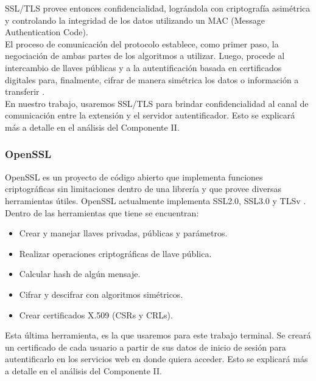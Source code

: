 \documentclass[12pt, a4paper, titlepage]{report}
\begin{document}
                SSL/TLS provee entonces confidencialidad, lográndola con criptografía asimétrica y controlando la integridad de los datos utilizando un MAC (Message Authentication Code).\\
                
                El proceso de comunicación del protocolo establece, como primer paso, la negociación de ambas partes de los algoritmos a utilizar. Luego, procede al intercambio de llaves públicas y a la autentificación basada en certificados digitales para, finalmente, cifrar de manera simétrica los datos o información a transferir \cite{refCriptografia}.\\
                
                En nuestro trabajo, usaremos SSL/TLS para brindar confidencialidad al canal de comunicación entre la extensión y el servidor autentificador. Esto se explicará más a detalle en el análisis del Componente II.
                
                \subsubsection{OpenSSL}
	            OpenSSL es un proyecto de código abierto que implementa funciones criptográficas sin limitaciones dentro de una librería y que provee diversas herramientas útiles. OpenSSL actualmente implementa SSL2.0, SSL3.0 y TLSv \cite{refCriptografia}.\\
	            
	            Dentro de las herramientas que tiene se encuentran: 
	            \begin{itemize}
	                \item Crear y manejar llaves privadas, públicas y parámetros.
	                \item Realizar operaciones criptográficas de llave pública.
	                \item Calcular hash de algún mensaje.
	                \item Cifrar y descifrar con algoritmos simétricos.
	                \item Crear certificados X.509 (CSRs y CRLs).
	            \end{itemize}
	            
	            Esta última herramienta, es la que usaremos para este trabajo terminal. Se creará un certificado de cada usuario a partir de sus datos de inicio de sesión para autentificarlo en los servicios web en donde quiera acceder. Esto se explicará más a detalle en el análisis del Componente II.
	            
\end{document}
